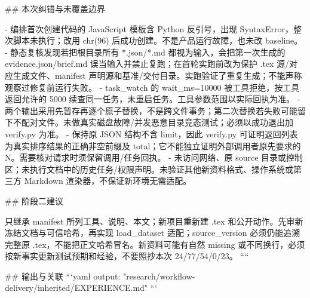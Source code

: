 ## 本次纠错与未覆盖边界

- 编排首次创建代码的 JavaScript 模板含 Python 反引号，出现 SyntaxError，整次脚本未执行；改用 chr(96) 后成功创建。不是产品运行故障，也未改 baseline。
- 静态复核发现若把根目录所有 *.json/*.md 都视为输入，会把第一次生成的 evidence.json/brief.md 误当输入并禁止复跑；在首轮实跑前改为保护 .tex 源/对应生成文件、manifest 声明源和基准/交付目录。实跑验证了重复生成；不能声称观察过修复前运行失败。
- task_watch 的 wait_ms=10000 被工具拒绝，按工具返回允许的 5000 续查同一任务，未重启任务。工具参数范围以实际回执为准。
- 两个输出采用先暂存再逐个原子替换，不是跨文件事务；第二次替换若失败可能留下不配对文件。未做真实磁盘故障/并发恶意目录竞态测试；必须以成功退出加 verify.py 为准。
- 保持原 JSON 结构不含 limit，因此 verify.py 可证明返回列表为真实排序结果的正确非空前缀及 total；它不能独立证明外部调用者原先要求的 N。需要核对请求时须保留调用/任务回执。
- 未访问网络、原 source 目录或控制区；未执行文档中的历史任务/权限声明。未验证其他新资料格式、操作系统或第三方 Markdown 渲染器，不保证新环境无需适配。

## 阶段二建议

只继承 manifest 所列工具、说明、本文；新项目重新建 .tex 和公开动作。先审新冻结文档与可信哈希，再实现 load_dataset 适配；source_version 必须仍能追溯完整原 .tex，不能把正文哈希冒名。新资料可能有自然 missing 或不同换行，必须按新事实更新测试预期和经验，不要照抄本次 24/77/54/0/23。
````

## 输出与关联
```yaml
output: "research/workflow-delivery/inherited/EXPERIENCE.md"
```
